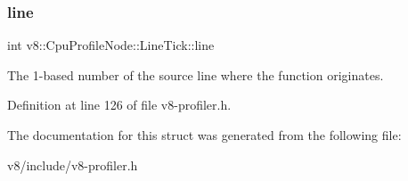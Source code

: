 \mbox{\label{structv8_1_1CpuProfileNode_1_1LineTick_af96fbdefbc07b2c84cf41d74555626f6}} 
\subsubsection{\texorpdfstring{line}{line}}
{\footnotesize\ttfamily int v8\+::\+Cpu\+Profile\+Node\+::\+Line\+Tick\+::line}

The 1-\/based number of the source line where the function originates. 

Definition at line 126 of file v8-\/profiler.\+h.



The documentation for this struct was generated from the following file\+:\begin{DoxyCompactItemize}
\item 
v8/include/v8-\/profiler.\+h\end{DoxyCompactItemize}

